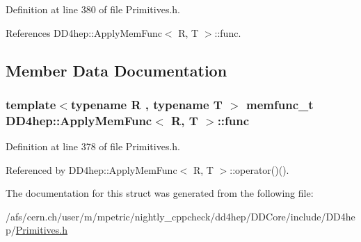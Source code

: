 Definition at line 380 of file Primitives.h.

References DD4hep::ApplyMemFunc$<$ R, T $>$::func.

\subsection{Member Data Documentation}
\hypertarget{struct_d_d4hep_1_1_apply_mem_func_a9cb93a8dbd712d6daf163e4b46992bf4}{
\subsubsection[{func}]{\setlength{\rightskip}{0pt plus 5cm}template$<$typename R , typename T $>$ {\bf memfunc\_\-t} {\bf DD4hep::ApplyMemFunc}$<$ R, {\bf T} $>$::{\bf func}}}
\label{struct_d_d4hep_1_1_apply_mem_func_a9cb93a8dbd712d6daf163e4b46992bf4}


Definition at line 378 of file Primitives.h.

Referenced by DD4hep::ApplyMemFunc$<$ R, T $>$::operator()().

The documentation for this struct was generated from the following file:\begin{DoxyCompactItemize}
\item 
/afs/cern.ch/user/m/mpetric/nightly\_\-cppcheck/dd4hep/DDCore/include/DD4hep/\hyperlink{_primitives_8h}{Primitives.h}\end{DoxyCompactItemize}
